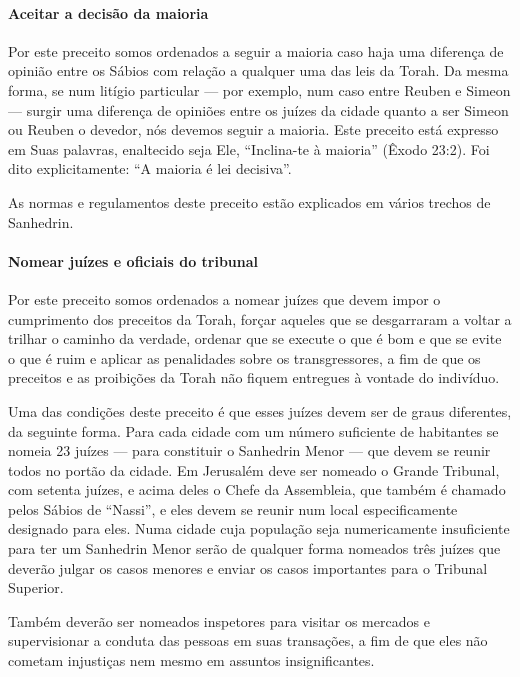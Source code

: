 \paragraph{Aceitar a decisão da maioria}

Por este preceito somos ordenados a seguir a maioria caso haja uma
diferença de opinião entre os Sábios com relação a qualquer uma das leis
da Torah. Da mesma forma, se num litígio particular --- por exemplo, num
caso entre Reuben e Simeon --- surgir uma diferença de opiniões entre os
juízes da cidade quanto a ser Simeon ou Reuben o devedor, nós devemos
seguir a maioria. Este preceito está expresso em Suas palavras,
enaltecido seja Ele, ``Inclina-te à maioria'' (Êxodo 23:2). Foi dito
explicitamente: ``A maioria é lei decisiva''.

As normas e regulamentos deste preceito estão explicados em vários
trechos de Sanhedrin.

\paragraph{Nomear juízes e oficiais do tribunal}

Por este preceito somos ordenados a nomear juízes que devem impor o
cumprimento dos preceitos da Torah, forçar aqueles que se desgarraram a
voltar a trilhar o caminho da verdade, ordenar que se execute o que é
bom e que se evite o que é ruim e aplicar as penalidades sobre os
transgressores, a fim de que os preceitos e as proibições da Torah não
fiquem entregues à vontade do indivíduo.

Uma das condições deste preceito é que esses juízes devem ser de graus
diferentes, da seguinte forma. Para cada cidade com um número
suficiente de habitantes se nomeia 23 juízes --- para constituir o
Sanhedrin Menor --- que devem se reunir todos no portão da cidade. Em
Jerusalém deve ser nomeado o Grande Tribunal, com setenta juízes, e
acima deles o Chefe da Assembleia, que também é chamado pelos Sábios de
``Nassi'', e eles devem se reunir num local especificamente designado
para eles. Numa cidade cuja população seja numericamente insuficiente
para ter um Sanhedrin Menor serão de qualquer forma nomeados três
juízes que deverão julgar os casos menores e enviar os casos importantes
para o Tribunal Superior.

Também deverão ser nomeados inspetores para visitar os mercados e
supervisionar a conduta das pessoas em suas transações, a fim de que
eles não cometam injustiças nem mesmo em assuntos insignificantes.

